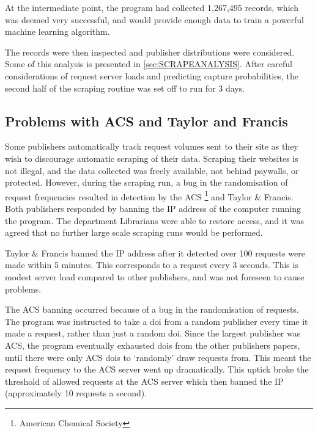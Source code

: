 At the intermediate point, the program had collected 1,267,495 records, which was deemed very successful, and would provide enough data to train a powerful machine learning algorithm.

The records were then inspected and publisher distributions were considered. Some of this analysis is presented in \ref{sec:SCRAPEANALYSIS}. After careful considerations of request server loads and predicting capture probabilities, the second half of the scraping routine was set off to run for 3 days.
\label{sec:CROSSREFSCRAPE}
\subsection{Problems with ACS and Taylor and Francis}
Some publishers automatically track request volumes sent to their site as they wish to discourage automatic scraping of their data. Scraping their websites is not illegal, and the data collected was freely available, not behind paywalls, or protected. However, during the scraping run, a bug in the randomisation of request frequencies resulted in detection by the ACS \footnote{American Chemical Society} and Taylor \& Francis. Both publishers responded by banning the IP address of the computer running the program. The department Librarians were able to restore access, and it was agreed that no further large scale scraping runs would be performed. 

Taylor \& Francis banned the IP address after it detected over 100 requests were made within 5 minutes. This corresponds to a request every 3 seconds. This is modest server load compared to other publishers, and was not foreseen to cause problems.

The ACS banning occurred because of a bug in the randomisation of requests. The program was instructed to take a doi from a random publisher every time it made a request, rather than just a random doi. Since the largest publisher was ACS, the program eventually exhausted dois from the other publishers papers, until there were only ACS dois to `randomly' draw requests from. This meant the request frequency to the ACS server went up dramatically. This uptick broke the threshold of allowed requests at the ACS server which then banned the IP (approximately 10 requests a second).


